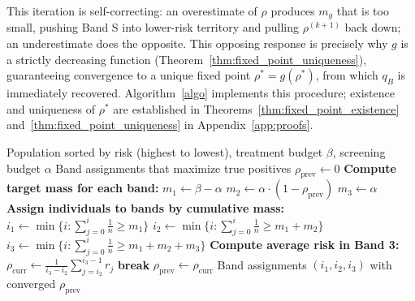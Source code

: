 This iteration is self-correcting: an overestimate of $\rho$ produces $m_g$ that is too small, pushing Band S into lower-risk territory and pulling $\rho^{(k+1)}$ back down; an underestimate does the opposite. This opposing response is precisely why $g$ is a strictly decreasing function (Theorem~\ref{thm:fixed_point_uniqueness}), guaranteeing convergence to a unique fixed point $\rho^* = g(\rho^*)$, from which $q_B$ is immediately recovered. Algorithm~\ref{algo} implements this procedure; existence and uniqueness of $\rho^*$ are established in Theorems~\ref{thm:fixed_point_existence} and~\ref{thm:fixed_point_uniqueness} in Appendix~\ref{app:proofs}.



\begin{algorithm*}
  \caption{Fixed-Point Iteration for Optimal Screening Band Assignment}
  \label{algo}
  \begin{algorithmic}[1]
  \Require Population sorted by risk (highest to lowest), treatment budget $\beta$, screening budget $\alpha$
  \Ensure Band assignments that maximize true positives
  \State $\rho_{\text{prev}} \gets 0$ 
      \State \textbf{Compute target mass for each band:}
      \State $m_1 \gets \beta - \alpha$ 
      \State $m_2 \gets \alpha \cdot (1 - \rho_{\text{prev}})$ 
      \State $m_3 \gets \alpha$ 
      \State
      \State \textbf{Assign individuals to bands by cumulative mass:}
      \State $i_1 \gets \min\{i : \sum_{j=0}^{i} \frac{1}{n} \geq m_1\}$ 
      \State $i_2 \gets \min\{i : \sum_{j=0}^{i} \frac{1}{n} \geq m_1 + m_2\}$ 
      \State $i_3 \gets \min\{i : \sum_{j=0}^{i} \frac{1}{n} \geq m_1 + m_2 + m_3\}$ 
      \State
      \State \textbf{Compute average risk in Band 3:}
      \State $\rho_{\text{curr}} \gets \frac{1}{i_3 - i_2} \sum_{j=i_2}^{i_3-1} r_j$ 
      \State
          \State \textbf{break} 
      \EndIf
      \State $\rho_{\text{prev}} \gets \rho_{\text{curr}}$ 
  \EndFor
  \State
  \Return Band assignments $(i_1, i_2, i_3)$ with converged $\rho_{\text{prev}}$
  \end{algorithmic}
  \end{algorithm*}





